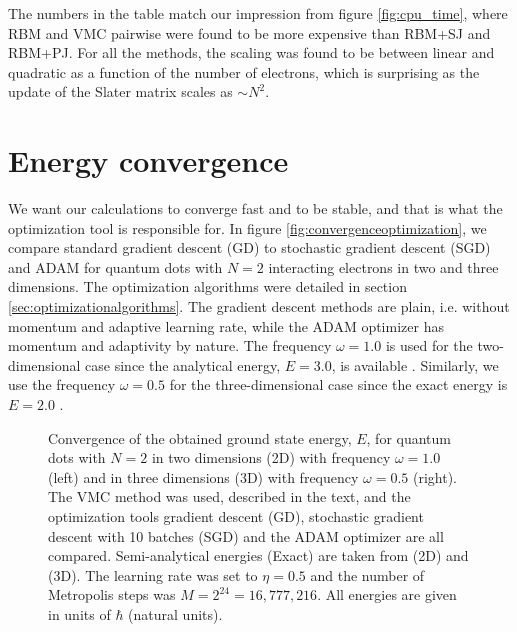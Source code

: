 The numbers in the table match our impression from figure \eqref{fig:cpu_time}, where RBM and VMC pairwise were found to be more expensive than RBM+SJ and RBM+PJ. For all the methods, the scaling was found to be between linear and quadratic as a function of the number of electrons, which is surprising as the update of the Slater matrix scales as $\sim N^2$. 

\section{Energy convergence}
We want our calculations to converge fast and to be stable, and that is what the optimization tool is responsible for. In figure \eqref{fig:convergenceoptimization}, we compare standard gradient descent (GD) to stochastic gradient descent (SGD) and ADAM for quantum dots with $N=2$ interacting electrons in two and three dimensions. The optimization algorithms were detailed in section \ref{sec:optimizationalgorithms}. The gradient descent methods are plain, i.e. without momentum and adaptive learning rate, while the ADAM optimizer has momentum and adaptivity by nature. The frequency $\omega=1.0$ is used for the two-dimensional case since the analytical energy, $E=3.0$, is available \supercite{taut_two_1993}. Similarly, we use the frequency $\omega=0.5$ for the three-dimensional case since the exact energy is $E=2.0$ \supercite{taut_two_1994}. 

\begin{figure}
	\centering 
	\subfloat{{}}
	\caption{Convergence of the obtained ground state energy, $E$, for quantum dots with $N=2$ in two dimensions (2D) with frequency $\omega=1.0$ (left) and in three dimensions (3D) with frequency $\omega=0.5$ (right). The VMC method was used, described in the text, and the optimization tools gradient descent (GD), stochastic gradient descent with 10 batches (SGD) and the ADAM optimizer are all compared. Semi-analytical energies (Exact) are taken from \citet{taut_two_1993} (2D) and \citet{taut_two_1994} (3D). The learning rate was set to $\eta=0.5$ and the number of Metropolis steps was $M=2^{24}=16,777,216$. All energies are given in units of $\hbar$ (natural units).}
	\label{fig:convergenceoptimization}
\end{figure} 

